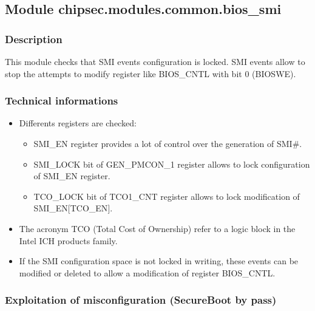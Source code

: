 \hypertarget{module-chipsec.modules.common.bios_smi}{%
\subsection{Module
chipsec.modules.common.bios\_smi}\label{module-chipsec.modules.common.bios_smi}}

\hypertarget{description-14}{%
\subsubsection{Description}\label{description-14}}

This module checks that SMI events configuration is locked. SMI events
allow to stop the attempts to modify register like BIOS\_CNTL with bit 0
(BIOSWE).

\hypertarget{technical-informations-13}{%
\subsubsection{Technical informations}\label{technical-informations-13}}

\begin{itemize}
\item
  Differents registers are checked:

  \begin{itemize}
  \tightlist
  \item
    SMI\_EN register provides a lot of control over the generation of
    SMI\#.
  \item
    SMI\_LOCK bit of GEN\_PMCON\_1 register allows to lock configuration
    of SMI\_EN register.
  \item
    TCO\_LOCK bit of TCO1\_CNT register allows to lock modification of
    SMI\_EN{[}TCO\_EN{]}.
  \end{itemize}
\item
  The acronym TCO (Total Cost of Ownership) refer to a logic block in
  the Intel ICH products family.
\item
  If the SMI configuration space is not locked in writing, these events
  can be modified or deleted to allow a modification of register
  BIOS\_CNTL.
\end{itemize}

\hypertarget{exploitation-of-misconfiguration-secureboot-by-pass}{%
\subsubsection{Exploitation of misconfiguration (SecureBoot by
pass)}\label{exploitation-of-misconfiguration-secureboot-by-pass}}

